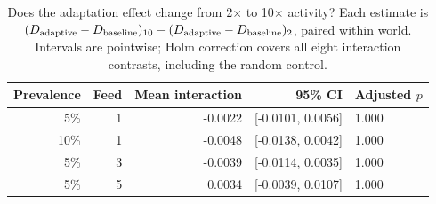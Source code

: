 \begin{table}[!htbp]
\caption{Does the adaptation effect change from 2$\times$ to 10$\times$ activity? Each estimate is $(D_{\rm adaptive}-D_{\rm baseline})_{10}-(D_{\rm adaptive}-D_{\rm baseline})_2$, paired within world. Intervals are pointwise; Holm correction covers all eight interaction contrasts, including the random control.}
\label{tab:adaptive-interaction}
\centering\small
\begin{tabular}{rrrrl}
\hline
Prevalence & Feed & Mean interaction & 95\% CI & Adjusted $p$ \\
\hline
5\% & 1 & -0.0022 & [-0.0101, 0.0056] & 1.000 \\
10\% & 1 & -0.0048 & [-0.0138, 0.0042] & 1.000 \\
5\% & 3 & -0.0039 & [-0.0114, 0.0035] & 1.000 \\
5\% & 5 & 0.0034 & [-0.0039, 0.0107] & 1.000 \\
\hline
\end{tabular}
\end{table}

